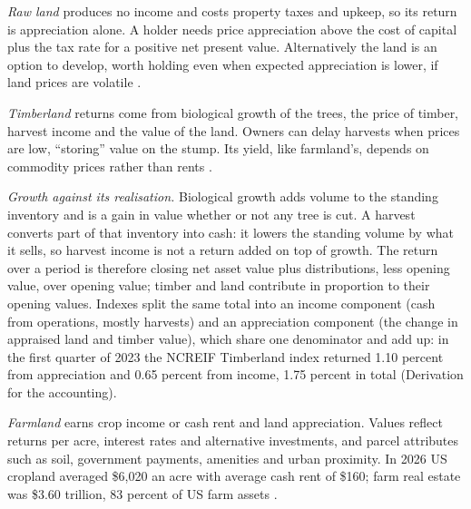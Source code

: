 \begin{qfmethod}\label{meth:land-timber-farmland}
 \emph{Raw land} produces no income and costs property taxes and upkeep, so its return is appreciation alone. A holder needs price appreciation above the cost of capital plus the tax rate for a positive net present value. Alternatively the land is an option to develop, worth holding even when expected appreciation is lower, if land prices are volatile \citep[p.~753]{investment-valuation-2012}.

\emph{Timberland} returns come from biological growth of the trees, the price of timber, harvest income and the value of the land. Owners can delay harvests when prices are low, ``storing'' value on the stump. Its yield, like farmland's, depends on commodity prices rather than rents \citep[p.~143]{demaria-private-markets-2021}.

\emph{Growth against its realisation.} Biological growth adds volume to the standing inventory and is a gain in value whether or not any tree is cut. A harvest converts part of that inventory into cash: it lowers the standing volume by what it sells, so harvest income is not a return added on top of growth. The return over a period is therefore closing net asset value plus distributions, less opening value, over opening value; timber and land contribute in proportion to their opening values. Indexes split the same total into an income component (cash from operations, mostly harvests) and an appreciation component (the change in appraised land and timber value), which share one denominator and add up: in the first quarter of 2023 the NCREIF Timberland index returned 1.10 percent from appreciation and 0.65 percent from income, 1.75 percent in total \citep[p.~28]{ncreif-timberland-2023q1} (Derivation for the accounting).

\emph{Farmland} earns crop income or cash rent and land appreciation. Values reflect returns per acre, interest rates and alternative investments, and parcel attributes such as soil, government payments, amenities and urban proximity. In 2026 US cropland averaged \$6,020 an acre with average cash rent of \$160; farm real estate was \$3.60 trillion, 83 percent of US farm assets \citep[ERS Farmland Value page, 2026 update]{nr-usda-farmland-2026}.


\end{qfmethod}

